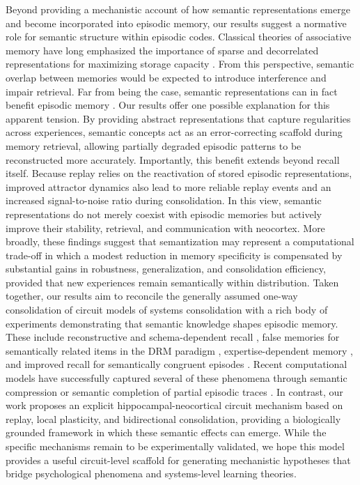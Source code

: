 \documentclass{article}
\begin{document}
Beyond providing a mechanistic account of how semantic representations emerge and become incorporated into episodic memory, our results suggest a normative role for semantic structure within episodic codes. Classical theories of associative memory have long emphasized the importance of sparse and decorrelated representations for maximizing storage capacity . From this perspective, semantic overlap between memories would be expected to introduce interference and impair retrieval. Far from being the case, semantic representations can in fact benefit episodic memory . Our results offer one possible explanation for this apparent tension. By providing abstract representations that capture regularities across experiences, semantic concepts act as an error-correcting scaffold during memory retrieval, allowing partially degraded episodic patterns to be reconstructed more accurately. Importantly, this benefit extends beyond recall itself. Because replay relies on the reactivation of stored episodic representations, improved attractor dynamics also lead to more reliable replay events and an increased signal-to-noise ratio during consolidation. In this view, semantic representations do not merely coexist with episodic memories but actively improve their stability, retrieval, and communication with neocortex. More broadly, these findings suggest that semantization may represent a computational trade-off in which a modest reduction in memory specificity is compensated by substantial gains in robustness, generalization, and consolidation efficiency, provided that new experiences remain semantically within distribution.
\newline\newline
Taken together, our results aim to reconcile the generally assumed one-way consolidation of circuit models of systems consolidation  with a rich body of experiments demonstrating that semantic knowledge shapes episodic memory. These include reconstructive and schema-dependent recall , false memories for semantically related items in the DRM paradigm , expertise-dependent memory , and improved recall for semantically congruent episodes . Recent computational models have successfully captured several of these phenomena through semantic compression  or semantic completion of partial episodic traces . In contrast, our work proposes an explicit hippocampal-neocortical circuit mechanism based on replay, local plasticity, and bidirectional consolidation, providing a biologically grounded framework in which these semantic effects can emerge. While the specific mechanisms remain to be experimentally validated, we hope this model provides a useful circuit-level scaffold for generating mechanistic hypotheses that bridge psychological phenomena and systems-level learning theories.
\end{document}
